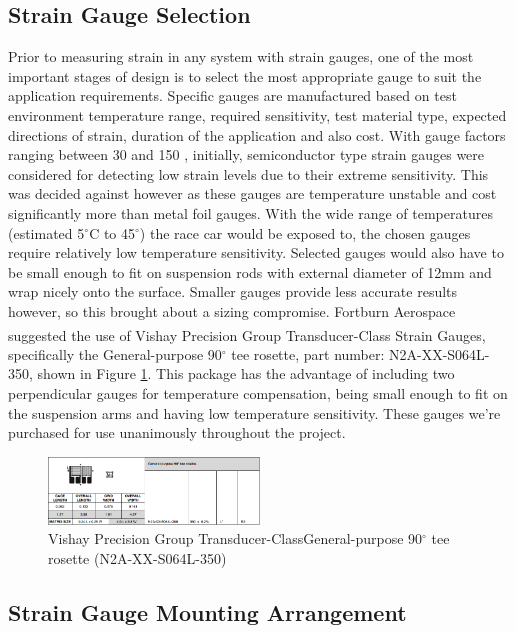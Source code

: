 \subsection{Strain Gauge Selection}
Prior to measuring strain in any system with strain gauges, one of the most important stages of design is to select the most appropriate gauge to suit the application requirements. Specific gauges are manufactured based on test environment temperature range, required sensitivity, test material type, expected directions of strain, duration of the application and also cost. With gauge factors ranging between 30 and 150 \cite{Text_18}, initially, semiconductor type strain gauges were considered for detecting low strain levels due to their extreme sensitivity. This was decided against however as these gauges are temperature unstable and cost significantly more than metal foil gauges. With the wide range of temperatures (estimated 5$^\circ$C to 45$^\circ$) the race car would be exposed to, the chosen gauges require relatively low temperature sensitivity. Selected gauges would also have to be small enough to fit on suspension rods with external diameter of 12mm and wrap nicely onto the surface. Smaller gauges provide less accurate results however, so this brought about a sizing compromise. Fortburn Aerospace suggested the use of Vishay Precision Group Transducer-Class\textsuperscript{\textregistered} Strain Gauges, specifically the General-purpose 90$^\circ$ tee rosette, part number: N2A-XX-S064L-350, shown in Figure \ref{fig:IMG_SG_GaugeData}. This package has the advantage of including two perpendicular gauges for temperature compensation, being small enough to fit on the suspension arms and having low temperature sensitivity. These gauges we're purchased for use unanimously throughout the project.

\begin{figure}[h!]
	\centering
	\includegraphics[width=0.5\textwidth]{Images/Strain_Gauges/IMG_SG_GaugeData.png}
	\caption{Vishay Precision Group Transducer-Class\textregistered General-purpose 90$^\circ$ tee rosette (N2A-XX-S064L-350) \cite{Text_19}}
	\label{fig:IMG_SG_GaugeData}
\end{figure}

\subsection{Strain Gauge Mounting Arrangement}
